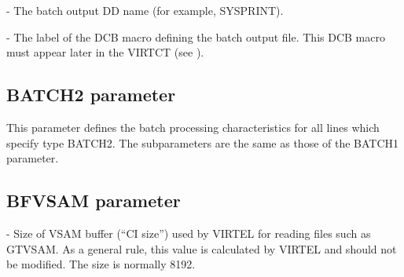 \documentclass[letterpaper,10pt,english]{sphinxmanual}
\begin{document}
 - The batch output DD name (for example, SYSPRINT).

 - The label of the DCB macro defining the batch output file. This DCB macro must appear later in the VIRTCT (see {\hyperref[\detokenize{Installation_Guide:vvrrig-bookmark72}]{}}).

\ignorespaces 

\subsection{BATCH2 parameter}
\label{\detokenize{Installation_Guide:batch2-parameter}}\label{\detokenize{Installation_Guide:index-39}}
\begin{sphinxVerbatim}[commandchars=\\\{\}]
    
\end{sphinxVerbatim}

This parameter defines the batch processing characteristics for all lines which specify type BATCH2. The subparameters are the same as those of the BATCH1 parameter.

\ignorespaces 

\subsection{BFVSAM parameter}
\label{\detokenize{Installation_Guide:bfvsam-parameter}}\label{\detokenize{Installation_Guide:index-40}}
\begin{sphinxVerbatim}[commandchars=\\\{\}]
 
\end{sphinxVerbatim}

 - Size of VSAM buffer (“CI size”) used by VIRTEL for reading files such as GTVSAM. As a general rule, this value is calculated by VIRTEL and should not be modified. The size is normally 8192.
\end{document}
